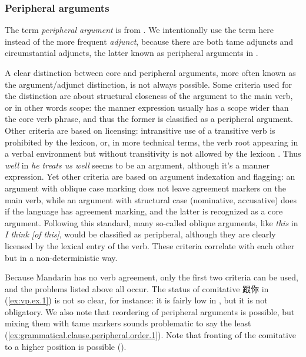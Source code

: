 \documentclass[UTF8, a4paper, oneside, scheme=plain, 12pt]{ctexrep}
\newcommand*{\term}[1]{\emph{#1}}
\newcommand{\form}[1]{\emph{#1}}
\begin{document}
\subsubsection{Peripheral arguments}\label{sec:grammatical.clause.peripheral}

The term \term{peripheral argument} is from \citet{dixon2009basic}.
We intentionally use the term here instead of the more frequent \term{adjunct},
because there are both \acs{tame} adjuncts and circumstantial adjuncts,
the latter known as peripheral arguments in \citet{dixon2009basic}.

A clear distinction between core and peripheral arguments,
more often known as the argument/adjunct distinction, is not always possible.
Some criteria used for the distinction are about structural closeness of the argument to the main verb, or in other words scope:
the manner expression usually has a scope wider than the core verb phrase,
and thus the former is classified as a peripheral argument.
Other criteria are based on licensing: intransitive use of a transitive verb is prohibited by the lexicon,
or, in more technical terms, the verb root appearing in a verbal environment but without transitivity is not allowed by the lexicon \citep{siddiqi2009syntax}.
Thus \form{well} in \form{he treats us well} seems to be an argument, although it's a manner expression.
Yet other criteria are based on argument indexation and flagging:
an argument with oblique case marking does not leave agreement markers on the main verb,
while an argument with structural case (nominative, accusative) does
if the language has agreement marking,
and the latter is recognized as a core argument.
Following this standard, many so-called oblique arguments,
like \form{this} in \form{I think [of this]}, would be classified as peripheral,
although they are clearly licensed by the lexical entry of the verb.
These criteria correlate with each other but in a non-deterministic way.

Because Mandarin has no verb agreement, only the first two criteria can be used,
and the problems listed above all occur.
The status of comitative 跟你 in (\ref{ex:vp.ex.1}) is not so clear, for instance:
it is fairly low in , but it is not obligatory.
We also note that reordering of peripheral arguments is possible,
but mixing them with \acs{tame} markers sounds problematic to say the least
(\ref{ex:grammatical.clause.peripheral.order.1}).
Note that fronting of the comitative to a higher position is possible ().
\end{document}
